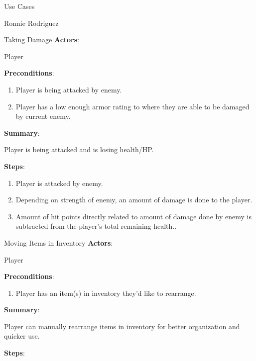 \documentclass[12pt]{report}
\begin{document}
\begin{section}{Use Cases}
\begin{subsection}{Ronnie Rodriguez}
\begin{subsubsection}{Taking Damage}
\textbf{Actors}:

Player

\textbf{Preconditions}:

\begin{enumerate}
\item Player is being attacked by enemy.
\item Player has a low enough armor rating to where they are able to be
damaged by current enemy.
\end{enumerate}

\textbf{Summary}:

Player is being attacked and is losing health/HP.

\textbf{Steps}:

\begin{enumerate}
\item Player is attacked by enemy.
\item Depending on strength of enemy, an amount of damage is done to the
player.
\item Amount of hit points directly related to amount of damage done by
enemy is subtracted from the player's total remaining health..
\end{enumerate}
\end{subsubsection}

\begin{subsubsection}{Moving Items in Inventory}
\textbf{Actors}:

Player

\textbf{Preconditions}:

\begin{enumerate}
\item Player has an item(s) in inventory they'd like to rearrange.
\end{enumerate}

\textbf{Summary}:

Player can manually rearrange items in inventory for better
organization and quicker use.

\textbf{Steps}:


\end{subsubsection}
\end{subsection}
\end{section}
\end{document}

